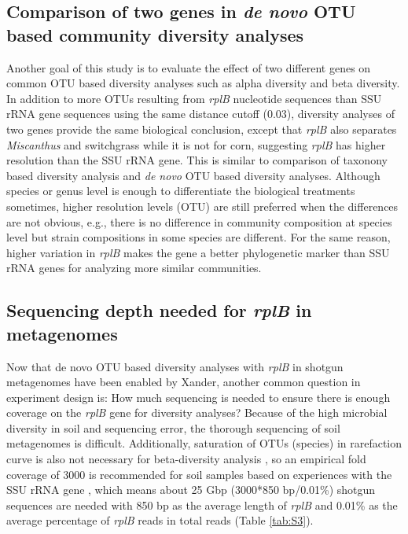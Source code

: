 \documentclass[]{msu-thesis}
\begin{document}
\subsection{Comparison of two genes in \textit{de novo} OTU based community diversity analyses}
Another goal of this study is to evaluate the effect of two different genes on common OTU based diversity analyses such as alpha diversity and beta diversity. In addition to more OTUs resulting from \textit{rplB} nucleotide sequences than SSU rRNA gene sequences using the same distance cutoff (0.03), diversity analyses of two genes provide the same biological conclusion, except that \textit{rplB} also separates \textit{Miscanthus} and switchgrass while it is not for corn, suggesting \textit{rplB} has higher resolution than the SSU rRNA gene. This is similar to comparison of taxonony based diversity analysis and \textit{de novo} OTU based diversity analyses. Although species or genus level is enough to differentiate the biological treatments sometimes, higher resolution levels (OTU) are still preferred when the differences are not obvious, e.g., there is no difference in community composition at species level but strain compositions in some species are different. For the same reason, higher variation in \textit{rplB} makes the gene a better phylogenetic marker than SSU rRNA genes for analyzing more similar communities.


\subsection{Sequencing depth needed for \textit{rplB} in metagenomes}
Now that de novo OTU based diversity analyses with \textit{rplB} in shotgun metagenomes have been enabled by Xander, another common question in experiment design is: How much sequencing is needed to ensure there is enough coverage on the \textit{rplB} gene for diversity analyses? Because of the high microbial diversity in soil and sequencing error, the thorough sequencing of soil metagenomes is difficult. Additionally, saturation of OTUs (species) in rarefaction curve is also not necessary for beta-diversity analysis \cite{caporaso_ultra-high-throughput_2012}, so an empirical fold coverage of 3000 is recommended for soil samples based on experiences with the SSU rRNA gene \cite{guo_microbial_2015}, which means about 25 Gbp (3000*850 bp/0.01\%) shotgun sequences are needed with 850 bp as the average length of \textit{rplB} and 0.01\% as the average percentage of \textit{rplB} reads in total reads (Table \ref{tab:S3}).
\end{document}
